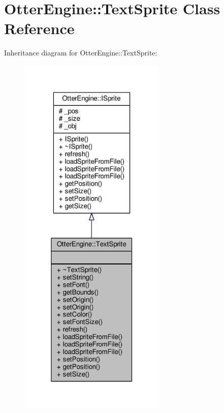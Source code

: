 \hypertarget{class_otter_engine_1_1_text_sprite}{}\section{Otter\+Engine\+:\+:Text\+Sprite Class Reference}
\label{class_otter_engine_1_1_text_sprite}


Inheritance diagram for Otter\+Engine\+:\+:Text\+Sprite\+:\nopagebreak
\begin{figure}[H]
\begin{center}
\leavevmode
\includegraphics[width=199pt]{d7/d73/class_otter_engine_1_1_text_sprite__inherit__graph}
\end{center}
\end{figure}


